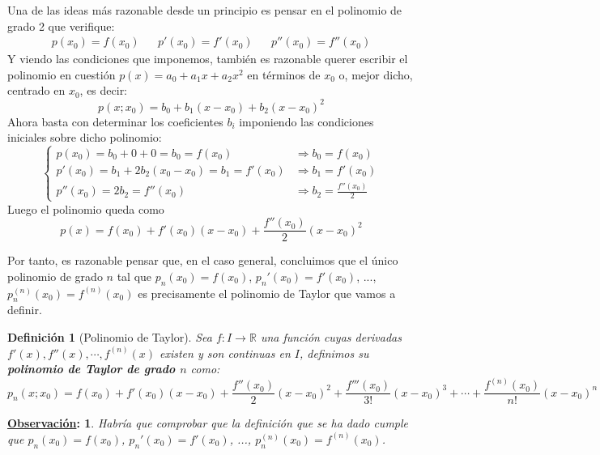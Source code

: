\documentclass[10pt,a4paper,openright]{book}
\theoremstyle{break}
\newtheorem*{defi}{Definición}
\newtheorem*{obs}{\underline{Observación}:}
\begin{document}
Una de las ideas más razonable desde un principio es pensar en el polinomio de grado 2 que verifique:
\begin{align*}
p(x_0)=f(x_0)  & &
p'(x_0)=f'(x_0) & &
p''(x_0)=f''(x_0)
\end{align*}
Y viendo las condiciones que imponemos, también es razonable querer escribir el polinomio en cuestión $p(x)=a_0+a_1x+a_2x^2$ en términos de $x_0$ o, mejor dicho, centrado en $x_0$, es decir:
$$p(x; x_0)=b_0+b_1(x-x_0)+b_2(x-x_0)^2$$
Ahora basta con determinar los coeficientes $b_i$ imponiendo las condiciones iniciales sobre dicho polinomio:
$$\begin{cases} p(x_0)=b_0+0+0=b_0=f(x_0)&\Rightarrow b_0=f(x_0)\\
p'(x_0)=b_1+2b_2(x_0-x_0)=b_1=f'(x_0)&\Rightarrow b_1=f'(x_0)\\
p''(x_0)=2b_2=f''(x_0)&\Rightarrow b_2= \frac{f''(x_0)}{2}\end{cases}$$
Luego el polinomio queda como
$$p(x)=f(x_0)+f'(x_0)(x-x_0)+\frac{f''(x_0)}{2}(x-x_0)^2$$

Por tanto, es razonable pensar que, en el caso general, concluimos que el único polinomio de grado $n$ tal que $p_n(x_0)=f(x_0)$, $p_n'(x_0)=f'(x_0)$, ..., $p_n^{(n)}(x_0)=f^{(n)}(x_0)$ es precisamente el polinomio de Taylor que vamos a definir.

\begin{defi}[Polinomio de Taylor]
Sea $f: I\rightarrow \mathbb{R}$ una función cuyas derivadas $f'(x), f''(x), \cdots, f^{(n)}(x)$ existen y son continuas en $I$, definimos su \textbf{polinomio de Taylor de grado $n$} como:
$$p_n(x; x_0)=f(x_0)+f'(x_0)(x-x_0)+\frac{f''(x_0)}{2}(x-x_0)^2+\frac{f'''(x_0)}{3!}(x-x_0)^3+ \cdots +\frac{f^{(n)}(x_0)}{n!}(x-x_0)^n$$
\end{defi}

\begin{obs}
Habría que comprobar que la definición que se ha dado cumple que $p_n(x_0)=f(x_0)$, $p_n'(x_0)=f'(x_0)$, ..., $p_n^{(n)}(x_0)=f^{(n)}(x_0)$.
\end{obs}
\end{document}
